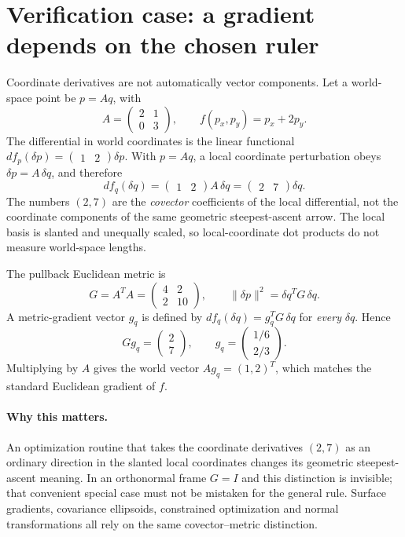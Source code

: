 \clearpage
\section*{Verification case: a gradient depends on the chosen ruler}
\noindent Coordinate derivatives are not automatically vector components.
Let a world-space point be \(p=Aq\), with
\[
A=\begin{pmatrix}2&1\\0&3\end{pmatrix},
\qquad f(p_x,p_y)=p_x+2p_y.
\]
The differential in world coordinates is the linear functional
\(df_p(\delta p)=\begin{pmatrix}1&2\end{pmatrix}\delta p\).
With \(p=Aq\), a local coordinate perturbation obeys
\(\delta p=A\,\delta q\), and therefore
\[
df_q(\delta q)=\begin{pmatrix}1&2\end{pmatrix}A\,\delta q
=\begin{pmatrix}2&7\end{pmatrix}\delta q.
\]
The numbers \((2,7)\) are the \emph{covector} coefficients of the local
differential, not the coordinate components of the same geometric
steepest-ascent arrow. The local basis is slanted and unequally scaled,
so local-coordinate dot products do not measure world-space lengths.

The pullback Euclidean metric is
\[
G=A^TA=\begin{pmatrix}4&2\\2&10\end{pmatrix},
\qquad
\lVert\delta p\rVert^2=\delta q^TG\,\delta q.
\]
A metric-gradient vector \(g_q\) is defined by
\(df_q(\delta q)=g_q^TG\,\delta q\) for \emph{every}
\(\delta q\). Hence
\[
Gg_q=\begin{pmatrix}2\\7\end{pmatrix},\qquad
g_q=\begin{pmatrix}1/6\\2/3\end{pmatrix}.
\]
Multiplying by \(A\) gives the world vector \(Ag_q=(1,2)^T\),
which matches the standard Euclidean gradient of \(f\).

\paragraph{Why this matters.}
An optimization routine that takes the coordinate derivatives \((2,7)\)
as an ordinary direction in the slanted local coordinates changes its
geometric steepest-ascent meaning. In an orthonormal frame \(G=I\) and
this distinction is invisible; that convenient special case must not
be mistaken for the general rule. Surface gradients, covariance
ellipsoids, constrained optimization and normal transformations all
rely on the same covector--metric distinction.


